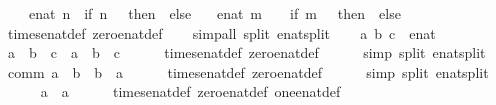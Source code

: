 \begin{isabellebody}
\ \ {\isachardoublequoteopen}{\isasyminfinity}\ {\isacharasterisk}\ enat\ n\ {\isacharequal}\ {\isacharparenleft}if\ n\ {\isacharequal}\ {}\ then\ {}\ else\ {\isasyminfinity}{\isacharparenright}{\isachardoublequoteclose}\isanewline
\ \ {\isachardoublequoteopen}enat\ m\ {\isacharasterisk}\ {\isasyminfinity}\ {\isacharequal}\ {\isacharparenleft}if\ m\ {\isacharequal}\ {}\ then\ {}\ else\ {\isasyminfinity}{\isacharparenright}{\isachardoublequoteclose}\isanewline
%
\isadelimproof
\ \ %
\endisadelimproof
%
\isatagproof
{}\isamarkupfalse%
\ times{\isacharunderscore}enat{\isacharunderscore}def\ zero{\isacharunderscore}enat{\isacharunderscore}def\isanewline
\ \ \isamarkupfalse%
\ {\isacharparenleft}simp{\isacharunderscore}all\ split{\isacharcolon}\ enat{\isachardot}split{\isacharparenright}%
\endisatagproof
{\isafoldproof}%
%
\isadelimproof
\isanewline
%
\endisadelimproof
\isanewline
{}\isamarkupfalse%
\isanewline
%
\isadelimproof
%
\endisadelimproof
%
\isatagproof
{}\isamarkupfalse%
\isanewline
\ \ \isamarkupfalse%
\ a\ b\ c\ {\isacharcolon}{\isacharcolon}\ enat\isanewline
\ \ \isamarkupfalse%
\ {\isachardoublequoteopen}{\isacharparenleft}a\ {\isacharasterisk}\ b{\isacharparenright}\ {\isacharasterisk}\ c\ {\isacharequal}\ a\ {\isacharasterisk}\ {\isacharparenleft}b\ {\isacharasterisk}\ c{\isacharparenright}{\isachardoublequoteclose}\isanewline
\ \ \ \ \isamarkupfalse%
\ times{\isacharunderscore}enat{\isacharunderscore}def\ zero{\isacharunderscore}enat{\isacharunderscore}def\isanewline
\ \ \ \ \isamarkupfalse%
\ {\isacharparenleft}simp\ split{\isacharcolon}\ enat{\isachardot}split{\isacharparenright}\isanewline
\ \ \isamarkupfalse%
\ comm{\isacharcolon}\ {\isachardoublequoteopen}a\ {\isacharasterisk}\ b\ {\isacharequal}\ b\ {\isacharasterisk}\ a{\isachardoublequoteclose}\isanewline
\ \ \ \ \isamarkupfalse%
\ times{\isacharunderscore}enat{\isacharunderscore}def\ zero{\isacharunderscore}enat{\isacharunderscore}def\isanewline
\ \ \ \ \isamarkupfalse%
\ {\isacharparenleft}simp\ split{\isacharcolon}\ enat{\isachardot}split{\isacharparenright}\isanewline
\ \ \isamarkupfalse%
\ {\isachardoublequoteopen}{}\ {\isacharasterisk}\ a\ {\isacharequal}\ a{\isachardoublequoteclose}\isanewline
\ \ \ \ \isamarkupfalse%
\ times{\isacharunderscore}enat{\isacharunderscore}def\ zero{\isacharunderscore}enat{\isacharunderscore}def\ one{\isacharunderscore}enat{\isacharunderscore}def\isanewline

\end{isabellebody}
